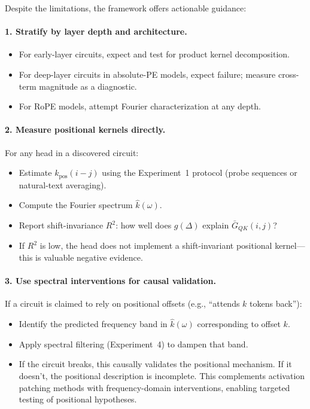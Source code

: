 \documentclass[11pt]{article}
\theoremstyle{definition}
\begin{document}
Despite the limitations, the framework offers actionable guidance:

\paragraph{1. Stratify by layer depth and architecture.}
\begin{itemize}
    \item For early-layer circuits, expect and test for product kernel decomposition.
    \item For deep-layer circuits in absolute-PE models, expect failure; measure cross-term magnitude as a diagnostic.
    \item For RoPE models, attempt Fourier characterization at any depth.
\end{itemize}

\paragraph{2. Measure positional kernels directly.}
For any head in a discovered circuit:
\begin{itemize}
    \item Estimate $k_{\text{pos}}(i-j)$ using the Experiment~1 protocol (probe sequences or natural-text averaging).
    \item Compute the Fourier spectrum $\hat{k}(\omega)$.
    \item Report shift-invariance $R^2$: how well does $g(\Delta)$ explain $\bar{G}_{QK}(i,j)$?
    \item If $R^2$ is low, the head does not implement a shift-invariant positional kernel---this is valuable negative evidence.
\end{itemize}

\paragraph{3. Use spectral interventions for causal validation.}
If a circuit is claimed to rely on positional offsets (e.g., ``attends $k$ tokens back''):
\begin{itemize}
    \item Identify the predicted frequency band in $\hat{k}(\omega)$ corresponding to offset $k$.
    \item Apply spectral filtering (Experiment~4) to dampen that band.
    \item If the circuit breaks, this causally validates the positional mechanism. If it doesn't, the positional description is incomplete. This complements activation patching methods \cite{heimersheim2024patching,meng2022locating} with frequency-domain interventions, enabling targeted testing of positional hypotheses.
\end{itemize}
\end{document}
